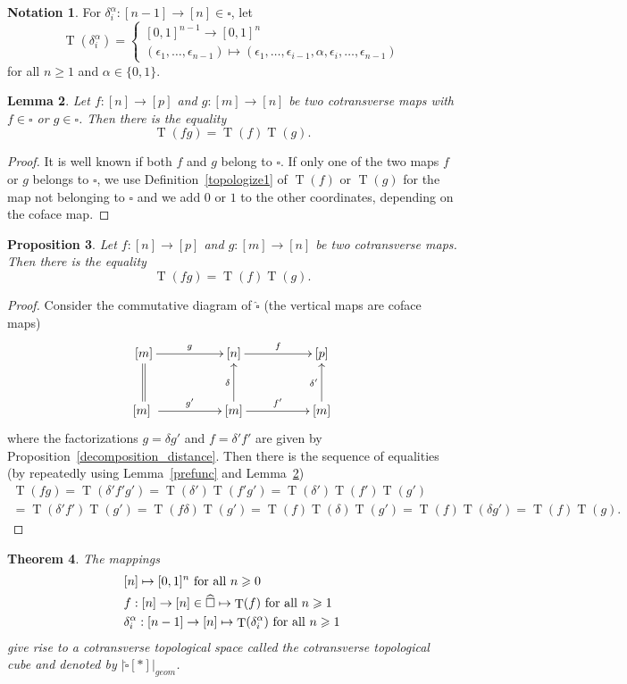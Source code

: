 \documentclass[a4paper,12pt]{amsart}
\makeatletter
\newtheorem{thm}{Theorem}[section]
\newtheorem{prop}[thm]{Proposition}
\newtheorem{lem}[thm]{Lemma}
\newcommand{\bp}{\begin{prop}}
\newcommand{\ep}{\end{prop}}
\newcommand{\bth}{\begin{thm}}
\renewcommand{\eth}{\end{thm}}
\newcommand{\bpf}{\begin{proof}}
\newcommand{\epf}{\end{proof}}
\theoremstyle{definition}
\newtheorem{nota}[thm]{Notation}
\newcommand{\fr}[1]{\ar@{->}[r]^-{#1}}
\newcommand{\fu}[1]{\ar@{->}[u]^-{#1}}
\renewcommand{\geq}{\geqslant}
\DeclareMathOperator{\TT}{T}
\makeatother
\begin{document}
\begin{nota}
	For $\delta_i^\alpha:[n-1]\to [n] \in \square$, let \[\TT(\delta_i^\alpha)=
	\begin{cases}
		[0,1]^{n-1} \to [0,1]^n\\
		(\epsilon_1, \dots, \epsilon_{n-1})\mapsto (\epsilon_1,\dots, \epsilon_{i-1}, \alpha, \epsilon_i, \dots, \epsilon_{n-1})
	\end{cases}
	\] for all $n\geq 1$ and $\alpha\in\{0,1\}$.
\end{nota}


\begin{lem} \label{prefunc0.5}
Let $f:[n]\to [p]$ and $g:[m]\to [n]$ be two cotransverse maps with $f\in \square$ or $g\in \square$. Then there is the equality \[\TT(fg) = \TT(f) \TT(g).\]
\end{lem}

\bpf It is well known if both $f$ and $g$ belong to $\square$. If only one of the two maps $f$ or $g$ belongs to $\square$, we use Definition~\ref{topologize1} of $\TT(f)$ or $\TT(g)$ for the map not belonging to $\square$ and we add $0$ or $1$ to the other coordinates, depending on the coface map. 
\epf


\bp \label{prefunc1}
Let $f:[n]\to [p]$ and $g:[m]\to [n]$ be two cotransverse maps. Then there is the equality \[\TT(fg) = \TT(f) \TT(g).\]
\ep

\bpf
Consider the commutative diagram of $\widehat{\square}$ (the vertical maps are coface maps)
\[
\xymatrix@C=5em@R=3em
{
	[m] \fr{g} & [n] \fr{f} & [p]\\
	[m] \ar@{=}[u] \fr{g'} & [m]\fu{\delta} \fr{f'}& [m]\fu{\delta'}
}
\]
where the factorizations $g=\delta g'$ and $f=\delta'f'$ are given by Proposition~\ref{decomposition_distance}. Then there is the sequence of equalities (by repeatedly using Lemma~\ref{prefunc} and Lemma~\ref{prefunc0.5})
\begin{multline*}
	\TT(fg) =\TT(\delta'f'g')= \TT(\delta') \TT(f'g')= \TT(\delta') \TT(f')\TT(g')\\=\TT(\delta'f')\TT(g')=\TT(f\delta)\TT(g')
	=\TT(f)\TT(\delta)\TT(g')=\TT(f)\TT(\delta g')=\TT(f)\TT(g).
\end{multline*}
\epf


\bth \label{cotransverse-cube}
The mappings 
\begin{align*}
	&[n]\mapsto [0,1]^n \hbox{ for all } n\geq 0\\
	&f:[n]\to [n]\in \widehat{\square} \mapsto \TT(f) \hbox{ for all } n\geq 1\\
	&\delta_i^\alpha:[n-1]\to [n] \mapsto \TT(\delta_i^\alpha) \hbox{ for all } n\geq 1
\end{align*}
give rise to a cotransverse topological space called the \textit{cotransverse topological cube} and denoted by $|\widehat{\square}[*]|_{geom}$.
\eth
\end{document}

